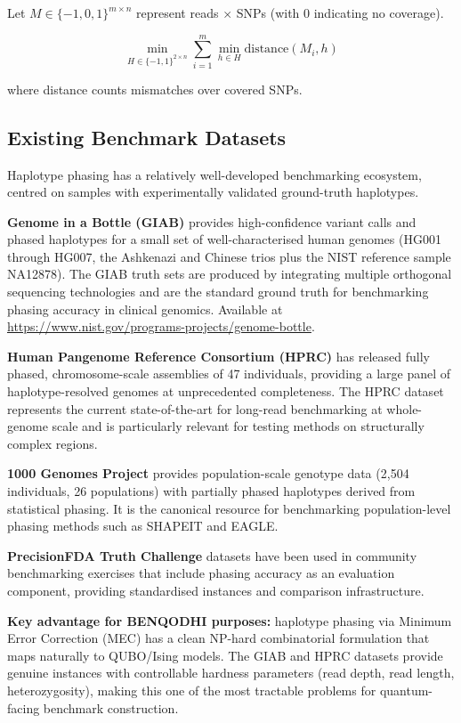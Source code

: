 \documentclass[11pt]{article}
\begin{document}
Let $M \in \{-1,0,1\}^{m \times n}$ represent reads $\times$ SNPs
(with $0$ indicating no coverage).

\[
\min_{H \in \{-1,1\}^{2 \times n}}
\sum_{i=1}^{m} \min_{h \in H}
\text{distance}(M_i, h)
\]

where distance counts mismatches over covered SNPs.

\subsection*{Existing Benchmark Datasets}

Haplotype phasing has a relatively well-developed benchmarking ecosystem, centred on
samples with experimentally validated ground-truth haplotypes.

\textbf{Genome in a Bottle (GIAB)} \cite{GIAB2014} provides high-confidence variant
calls and phased haplotypes for a small set of well-characterised human genomes (HG001
through HG007, the Ashkenazi and Chinese trios plus the NIST reference sample NA12878).
The GIAB truth sets are produced by integrating multiple orthogonal sequencing
technologies and are the standard ground truth for benchmarking phasing accuracy
in clinical genomics. Available at \url{https://www.nist.gov/programs-projects/genome-bottle}.

\textbf{Human Pangenome Reference Consortium (HPRC)} \cite{HPRC2023} has released fully
phased, chromosome-scale assemblies of 47 individuals, providing a large panel of
haplotype-resolved genomes at unprecedented completeness. The HPRC dataset represents
the current state-of-the-art for long-read benchmarking at whole-genome scale and is
particularly relevant for testing methods on structurally complex regions.

\textbf{1000 Genomes Project} \cite{1000Genomes2015} provides population-scale genotype
data (2{,}504 individuals, 26 populations) with partially phased haplotypes derived from
statistical phasing. It is the canonical resource for benchmarking population-level
phasing methods such as SHAPEIT and EAGLE.

\textbf{PrecisionFDA Truth Challenge} datasets \cite{PrecisionFDA} have been used in
community benchmarking exercises that include phasing accuracy as an evaluation component,
providing standardised instances and comparison infrastructure.

\textbf{Key advantage for BENQODHI purposes:} haplotype phasing via Minimum Error
Correction (MEC) has a clean NP-hard combinatorial formulation that maps naturally to
QUBO/Ising models. The GIAB and HPRC datasets provide genuine instances with
controllable hardness parameters (read depth, read length, heterozygosity), making this
one of the most tractable problems for quantum-facing benchmark construction.
\end{document}

